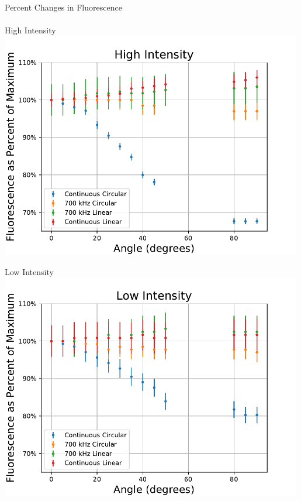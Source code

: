 \documentclass{beamer}
\begin{document}
\begin{frame}{Percent Changes in Fluorescence}
\framesubtitle{}
\centering
\begin{minipage}{.49\textwidth}
\centering
	High Intensity
	\includegraphics[width=0.99\textwidth]{../MRPData/MAR24/togetherscaled.pdf}
\end{minipage}
\begin{minipage}{.49\textwidth}
\centering
	Low Intensity
	\includegraphics[width=0.99\textwidth]{../MRPData/April16/togetherscaled.pdf}
\end{minipage}
\end{frame}
\end{document}
